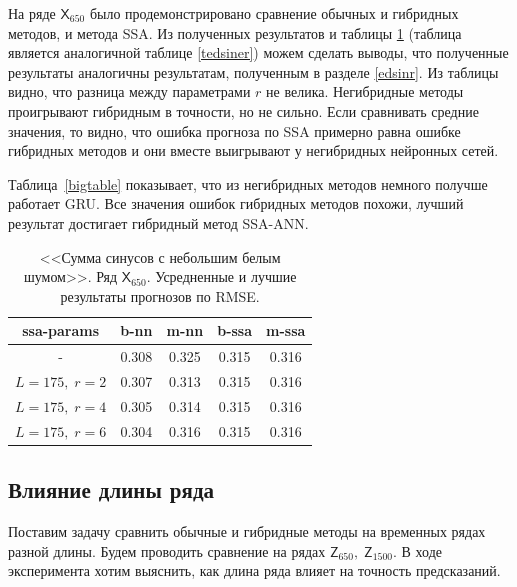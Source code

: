 \documentclass[specialist,
               substylefile = spbu.rtx,
               subf,href,colorlinks=true, 12p]{disser}
\begin{document}
На ряде $\mathsf{X}_{650}$ было продемонстрировано сравнение обычных и гибридных методов, и метода SSA. Из полученных результатов и таблицы \ref{tedsineN0.3r} (таблица является аналогичной таблице \ref{tedsiner}) можем сделать выводы, что полученные результаты аналогичны результатам, полученным в разделе \ref{edsinr}. Из таблицы видно, что разница между параметрами $r$ не велика. Негибридные методы проигрывают гибридным в точности, но не сильно.
Если сравнивать средние значения, то видно, что ошибка прогноза по SSA примерно равна ошибке гибридных методов и они вместе выигрывают у негибридных нейронных сетей.

Таблица~\ref{bigtable} показывает, что из негибридных методов немного получше работает GRU. Все значения ошибок гибридных методов похожи, лучший результат достигает гибридный метод SSA-ANN.

\begin{table}[H]
	\captionsetup{justification=centering}
	\caption{<<Сумма синусов с небольшим белым шумом>>. Ряд $\mathsf{X}_{650}$. Усредненные и лучшие результаты прогнозов по RMSE.}
	\begin{center}
		\begin{tabular}{ccccc}
			\toprule
			{ssa-params} &  b-nn &  m-nn &  b-ssa &  m-ssa \\
			\midrule
			-          & 0.308 & 0.325 &  0.315 &  0.316 \\
			$ L = 175, \; r = 2$         & 0.307 & 0.313 &  0.315 &  0.316 \\
			$ L = 175, \; r = 4$         & 0.305 & 0.314 &  0.315 &  0.316 \\
			$ L = 175, \; r = 6$        & 0.304 & 0.316 &  0.315 &  0.316 \\
			\bottomrule
		\end{tabular}
	\end{center}
	\label{tedsineN0.3r}
\end{table}

\subsection{Влияние длины ряда}
\label{edsinlen}
Поставим задачу сравнить обычные и гибридные методы на временных рядах разной длины. Будем проводить сравнение на рядах $\mathsf{Z}_{650},\; \mathsf{Z}_{1500}$. В ходе эксперимента хотим выяснить, как длина ряда влияет на точность предсказаний.
\end{document}
